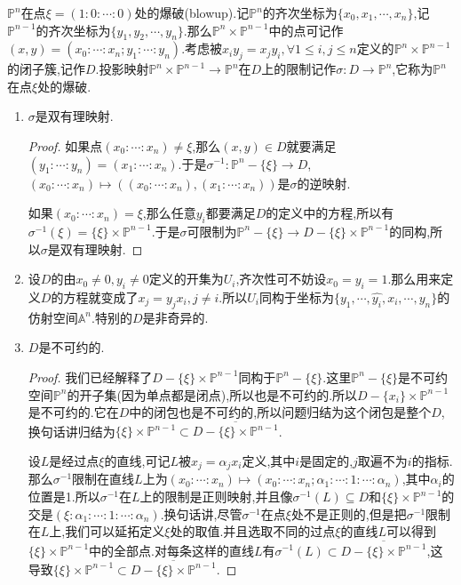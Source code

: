 $\mathbb{P}^n$在点$\xi=(1:0:\cdots:0)$处的爆破(blowup).记$\mathbb{P}^n$的齐次坐标为$\{x_0,x_1,\cdots,x_n\}$,记$\mathbb{P}^{n-1}$的齐次坐标为$\{y_1,y_2,\cdots,y_n\}$.那么$\mathbb{P}^n\times\mathbb{P}^{n-1}$中的点可记作$(x,y)=(x_0:\cdots:x_n;y_1:\cdots:y_n)$.考虑被$x_iy_j=x_jy_i,\forall 1\le i,j\le n$定义的$\mathbb{P}^n\times\mathbb{P}^{n-1}$的闭子簇,记作$D$.投影映射$\mathbb{P}^n\times\mathbb{P}^{n-1}\to\mathbb{P}^n$在$D$上的限制记作$\sigma:D\to\mathbb{P}^n$,它称为$\mathbb{P}^n$在点$\xi$处的爆破.
\begin{enumerate}
	\item $\sigma$是双有理映射.
	\begin{proof}
		
		如果点$(x_0:\cdots:x_n)\not=\xi$,那么$(x,y)\in D$就要满足$(y_1:\cdots:y_n)=(x_1:\cdots:x_n)$.于是$\sigma^{-1}:\mathbb{P}^n-\{\xi\}\to D$,$(x_0:\cdots:x_n)\mapsto((x_0:\cdots:x_n),(x_1:\cdots:x_n))$是$\sigma$的逆映射.
		
		如果$(x_0:\cdots:x_n)=\xi$,那么任意$y_i$都要满足$D$的定义中的方程,所以有$\sigma^{-1}(\xi)=\{\xi\}\times\mathbb{P}^{n-1}$.于是$\sigma$可限制为$\mathbb{P}^n-\{\xi\}\to D-\{\xi\}\times\mathbb{P}^{n-1}$的同构,所以$\sigma$是双有理映射.
	\end{proof}
    \item 设$D$的由$x_0\not=0,y_i\not=0$定义的开集为$U_i$,齐次性可不妨设$x_0=y_i=1$.那么用来定义$D$的方程就变成了$x_j=y_jx_i,j\not=i$.所以$U_i$同构于坐标为$\{y_1,\cdots,\hat{y_i},x_i,\cdots,y_n\}$的仿射空间$\mathbb{A}^n$.特别的$D$是非奇异的.
    \item $D$是不可约的.
    \begin{proof}
    	
    	我们已经解释了$D-\{\xi\}\times\mathbb{P}^{n-1}$同构于$\mathbb{P}^n-\{\xi\}$.这里$\mathbb{P}^n-\{\xi\}$是不可约空间$\mathbb{P}^n$的开子集(因为单点都是闭点),所以也是不可约的.所以$D-\{x_i\}\times\mathbb{P}^{n-1}$是不可约的.它在$D$中的闭包也是不可约的,所以问题归结为这个闭包是整个$D$,换句话讲归结为$\{\xi\}\times\mathbb{P}^{n-1}\subset\overline{D-\{\xi\}\times\mathbb{P}^{n-1}}$.
    	
    	设$L$是经过点$\xi$的直线,可记$L$被$x_j=\alpha_jx_i$定义,其中$i$是固定的,$j$取遍不为$i$的指标.那么$\sigma^{-1}$限制在直线$L$上为$(x_0:\cdots:x_n)\mapsto(x_0:\cdots:x_n;\alpha_1:\cdots:1:\cdots:\alpha_n)$,其中$\alpha_i$的位置是1.所以$\sigma^{-1}$在$L$上的限制是正则映射,并且像$\sigma^{-1}(L)\subseteq D$和$\{\xi\}\times\mathbb{P}^{n-1}$的交是$(\xi:\alpha_1:\cdots:1:\cdots:\alpha_n)$.换句话讲,尽管$\sigma^{-1}$在点$\xi$处不是正则的,但是把$\sigma^{-1}$限制在$L$上,我们可以延拓定义$\xi$处的取值.并且选取不同的过点$\xi$的直线$L$可以得到$\{\xi\}\times\mathbb{P}^{n-1}$中的全部点.对每条这样的直线$L$有$\sigma^{-1}(L)\subset\overline{D-\{\xi\}\times\mathbb{P}^{n-1}}$,这导致$\{\xi\}\times\mathbb{P}^{n-1}\subset\overline{D-\{\xi\}\times\mathbb{P}^{n-1}}$.
    \end{proof}
\end{enumerate}

